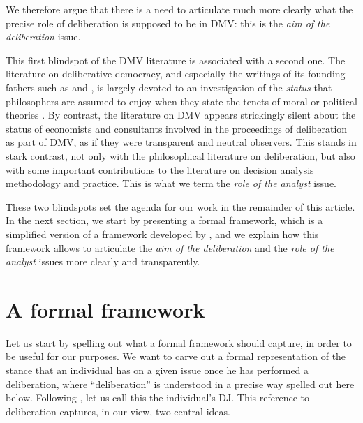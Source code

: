 \documentclass[version=3.21, pagesize, twoside=off, bibliography=totoc, DIV=calc, fontsize=12pt, a4paper, french, english]{scrartcl}
\begin{document}
We therefore argue that there is a need to articulate much more clearly what the precise role of deliberation is supposed to be in DMV: this is the \emph{aim of the deliberation} issue.

This first blindspot of the DMV literature is associated with a second one. The literature on deliberative democracy, and especially the writings of its founding fathers such as \citet{rawls_political_2005} and \citet{habermas_faktizitat_1992}, is largely devoted to an investigation of the \emph{status} that philosophers are assumed to enjoy when they state the tenets of moral or political theories \citep{meinard_du_2014}. 
By contrast, the literature on DMV appears strickingly silent about the status of economists and consultants involved in the proceedings of deliberation as part of DMV, as if they were transparent and neutral observers. 
This stands in stark contrast, not only with the philosophical literature on deliberation, but also with some important contributions to the literature on decision analysis methodology and practice. 
This is what we term the \emph{role of the analyst} issue.

These two blindspots set the agenda for our work in the remainder of this article. 
In the next section, we start by presenting a formal framework, which is a simplified version of a framework developed by \citet{cailloux_formal_2018}, and we explain how this framework allows to articulate the \emph{aim of the deliberation} and the \emph{role of the analyst} issues more clearly and transparently.

\section{A formal framework}
Let us start by spelling out what a formal framework should capture, in order to be useful for our purposes. 
We want to carve out a formal representation of the stance that an individual has on a given issue once he has performed a deliberation, where “deliberation” is understood in a precise way spelled out here below. 
Following \citet{cailloux_formal_2018}, let us call this the individual's \ac{DJ}. 
This reference to deliberation captures, in our view, two central ideas.
\end{document}
